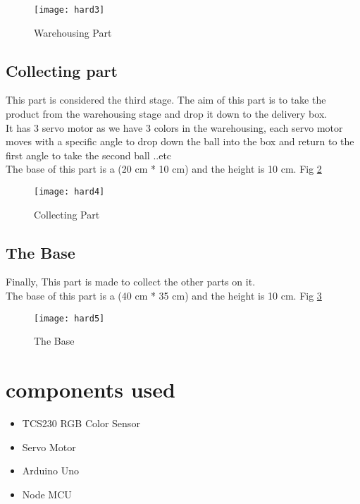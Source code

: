 \begin{figure}[h]
    \texttt{[image: hard3]}
    \centering
    \caption{Warehousing Part}
    \label{fig:hard3}
\end{figure}

\subsection{Collecting part}
This part is considered the third stage. The aim of this part is to take the product from the warehousing
stage and drop it down to the delivery box.\\
It has 3 servo motor as we have 3 colors in the warehousing, each servo motor moves with a specific
angle to drop down the ball into the box and return to the first angle to take the second ball ..etc\\
The base of this part is a (20 cm * 10 cm) and the height is 10 cm. Fig \ref{fig:hard4}

\begin{figure}[h]
    \texttt{[image: hard4]}
    \centering
    \caption{Collecting Part}
    \label{fig:hard4}
\end{figure}

\subsection{The Base}
Finally, This part is made to collect the other parts on it.\\
The base of this part is a (40 cm * 35 cm) and the height is 10 cm. Fig \ref{fig:hard5}

\begin{figure}[h]
    \texttt{[image: hard5]}
    \centering
    \caption{The Base}
    \label{fig:hard5}
\end{figure}

\section{components used}

\begin{itemize}
    \item TCS230 RGB Color Sensor
    \item Servo Motor
    \item Arduino Uno
    \item Node MCU
\end{itemize}

